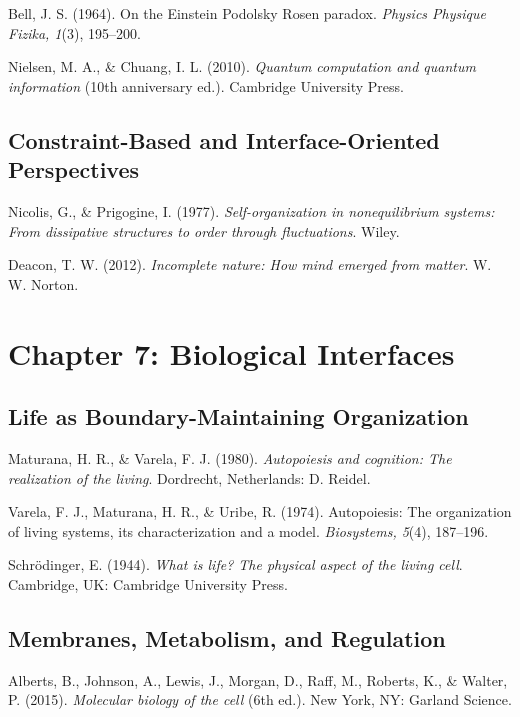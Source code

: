 \documentclass[
  openright]{book}
\begin{document}
Bell, J. S. (1964). On the Einstein Podolsky Rosen paradox.
\emph{Physics Physique Fizika, 1}(3), 195--200.

Nielsen, M. A., \& Chuang, I. L. (2010). \emph{Quantum computation and
quantum information} (10th anniversary ed.). Cambridge University Press.

\subsection{Constraint-Based and Interface-Oriented
Perspectives}\label{constraint-based-and-interface-oriented-perspectives}

Nicolis, G., \& Prigogine, I. (1977). \emph{Self-organization in
nonequilibrium systems: From dissipative structures to order through
fluctuations}. Wiley.

Deacon, T. W. (2012). \emph{Incomplete nature: How mind emerged from
matter}. W. W. Norton.

\section{Chapter 7: Biological
Interfaces}\label{chapter-7-biological-interfaces}

\subsection{Life as Boundary-Maintaining
Organization}\label{life-as-boundary-maintaining-organization-1}

Maturana, H. R., \& Varela, F. J. (1980). \emph{Autopoiesis and
cognition: The realization of the living}. Dordrecht, Netherlands: D.
Reidel.

Varela, F. J., Maturana, H. R., \& Uribe, R. (1974). Autopoiesis: The
organization of living systems, its characterization and a model.
\emph{Biosystems, 5}(4), 187--196.

Schrödinger, E. (1944). \emph{What is life? The physical aspect of the
living cell}. Cambridge, UK: Cambridge University Press.

\subsection{Membranes, Metabolism, and
Regulation}\label{membranes-metabolism-and-regulation-1}

Alberts, B., Johnson, A., Lewis, J., Morgan, D., Raff, M., Roberts, K.,
\& Walter, P. (2015). \emph{Molecular biology of the cell} (6th ed.).
New York, NY: Garland Science.
\end{document}
